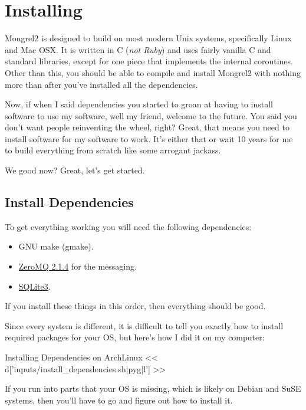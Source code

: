 \chapter{Installing}

Mongrel2 is designed to build on most modern Unix systems, specifically Linux
and Mac OSX.  It is written in C (\emph{not Ruby}) and uses fairly vanilla
C and standard libraries, except for one piece that implements the internal
coroutines.  Other than this, you should be able to compile and install Mongrel2
with nothing more than  after you've installed
all the dependencies.

Now, if when I said dependencies you started to groan at having to install
software to use my software, well my friend, welcome to the future.  You
said you don't want people reinventing the wheel, right?  Great, that means
you need to install software for my software to work.  It's either that or
wait 10 years for me to build everything from scratch like some arrogant
jackass.

We good now?  Great, let's get started.

\section{Install Dependencies}

To get everything working you will need the following dependencies:

\begin{itemize}
\item GNU make (gmake).
\item \href{http://zeromq.org}{ZeroMQ 2.1.4} for the messaging.
\item \href{http://www.sqlite.org/}{SQLite3}.
\end{itemize}

If you install these things in this order, then everything should be good.

Since every system is different, it is difficult to tell you exactly how to
install required packages for your OS, but here's how I did it on my computer:

\begin{code}{Installing Dependencies on ArchLinux}
<< d['inputs/install_dependencies.sh|pyg|l'] >>
\end{code}

If you run into parts that your OS is missing, which is likely on
Debian and SuSE systems, then you'll have to go and figure out
how to install it.

